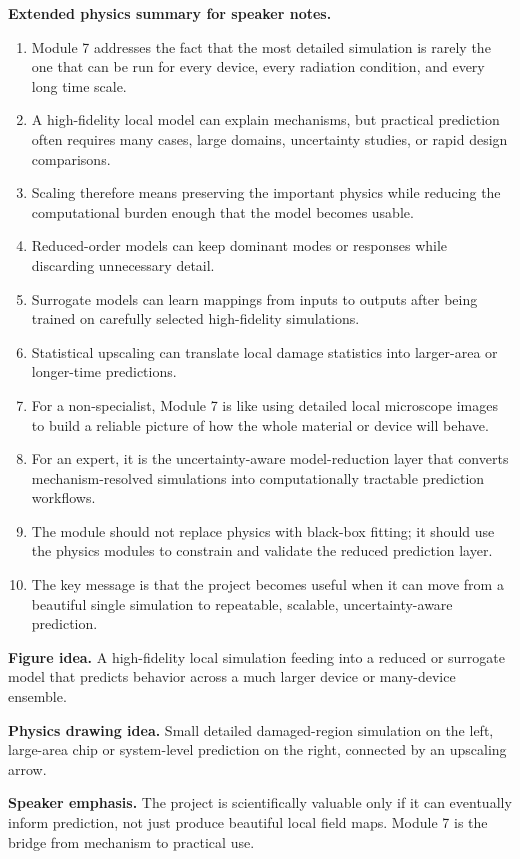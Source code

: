 \documentclass[11pt]{article}
\begin{document}
\textbf{Extended physics summary for speaker notes.}
\begin{enumerate}[leftmargin=1.6em]
    \item Module 7 addresses the fact that the most detailed simulation is rarely the one that can be run for every device, every radiation condition, and every long time scale.
    \item A high-fidelity local model can explain mechanisms, but practical prediction often requires many cases, large domains, uncertainty studies, or rapid design comparisons.
    \item Scaling therefore means preserving the important physics while reducing the computational burden enough that the model becomes usable.
    \item Reduced-order models can keep dominant modes or responses while discarding unnecessary detail.
    \item Surrogate models can learn mappings from inputs to outputs after being trained on carefully selected high-fidelity simulations.
    \item Statistical upscaling can translate local damage statistics into larger-area or longer-time predictions.
    \item For a non-specialist, Module 7 is like using detailed local microscope images to build a reliable picture of how the whole material or device will behave.
    \item For an expert, it is the uncertainty-aware model-reduction layer that converts mechanism-resolved simulations into computationally tractable prediction workflows.
    \item The module should not replace physics with black-box fitting; it should use the physics modules to constrain and validate the reduced prediction layer.
    \item The key message is that the project becomes useful when it can move from a beautiful single simulation to repeatable, scalable, uncertainty-aware prediction.
\end{enumerate}

\textbf{Figure idea.} A high-fidelity local simulation feeding into a reduced or surrogate model that predicts behavior across a much larger device or many-device ensemble.

\textbf{Physics drawing idea.} Small detailed damaged-region simulation on the left, large-area chip or system-level prediction on the right, connected by an upscaling arrow.

\textbf{Speaker emphasis.} The project is scientifically valuable only if it can eventually inform prediction, not just produce beautiful local field maps. Module 7 is the bridge from mechanism to practical use.
\end{document}
